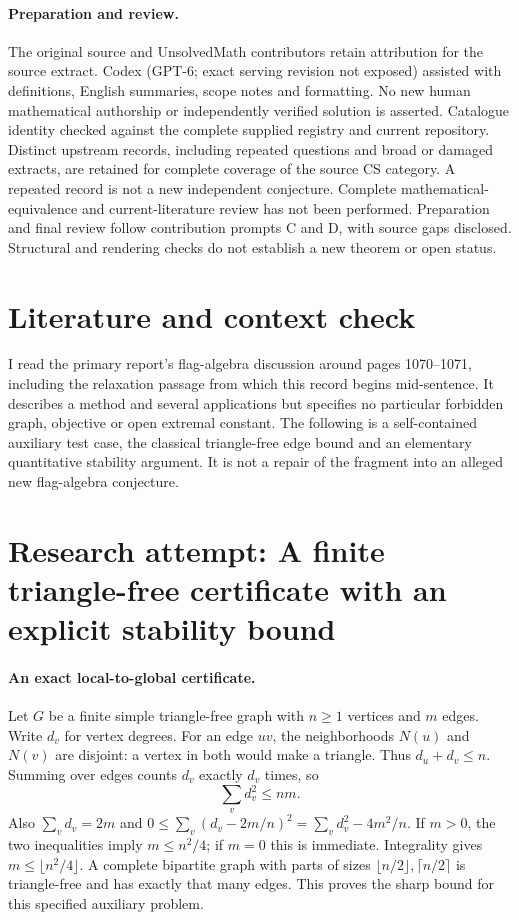 \documentclass[11pt]{article}
\begin{document}
\paragraph{Preparation and review.}
The original source and UnsolvedMath contributors retain attribution for the source extract. Codex (GPT-6; exact serving revision not exposed) assisted with definitions, English summaries, scope notes and formatting. No new human mathematical authorship or independently verified solution is asserted. Catalogue identity checked against the complete supplied registry and current repository. Distinct upstream records, including repeated questions and broad or damaged extracts, are retained for complete coverage of the source CS category. A repeated record is not a new independent conjecture. Complete mathematical-equivalence and current-literature review has not been performed. Preparation and final review follow contribution prompts C and D, with source gaps disclosed. Structural and rendering checks do not establish a new theorem or open status.
\label{end:statement}

\section{Literature and context check}

I read the primary report's flag-algebra discussion around pages 1070--1071,
including the relaxation passage from which this record begins mid-sentence.
It describes a method and several applications but specifies no particular
forbidden graph, objective or open extremal constant. The following is a
self-contained auxiliary test case, the classical triangle-free edge bound and
an elementary quantitative stability argument. It is not a repair of the
fragment into an alleged new flag-algebra conjecture.

\section{Research attempt: A finite triangle-free certificate with an explicit stability bound}

\paragraph{An exact local-to-global certificate.}
Let $G$ be a finite simple triangle-free graph with $n\geq1$ vertices and $m$
edges. Write $d_v$ for vertex degrees. For an edge $uv$, the neighborhoods
$N(u)$ and $N(v)$ are disjoint: a vertex in both would make a triangle.
Thus $d_u+d_v\leq n$. Summing over edges counts $d_v$ exactly $d_v$ times,
so
\[
 \sum_v d_v^2\leq nm.
\]
Also $\sum_vd_v=2m$ and
$0\leq\sum_v(d_v-2m/n)^2=\sum_vd_v^2-4m^2/n$.
If $m>0$, the two inequalities imply $m\leq n^2/4$; if $m=0$ this is immediate.
Integrality gives $m\leq\lfloor n^2/4\rfloor$. A complete bipartite graph
with parts of sizes $\lfloor n/2\rfloor,\lceil n/2\rceil$ is triangle-free
and has exactly that many edges. This proves the sharp bound for this
specified auxiliary problem.
\end{document}
